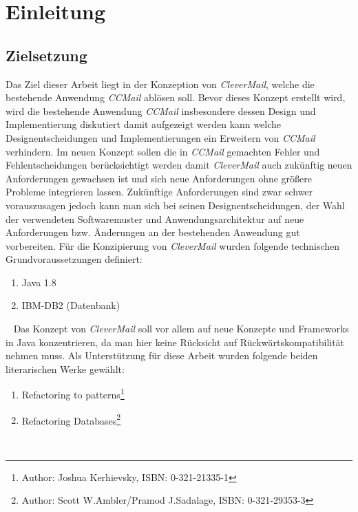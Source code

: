 \chapter{Einleitung}
\label{cha:einleitung}
\section{Zielsetzung}
\label{sec:zielsetzung}
Das Ziel dieser Arbeit liegt in der Konzeption von \emph{CleverMail}, welche die bestehende Anwendung \emph{CCMail} ablösen soll. Bevor dieses Konzept erstellt wird, wird die bestehende Anwendung \emph{CCMail} insbesondere dessen Design und Implementierung diskutiert damit aufgezeigt werden kann welche \newline
Designentscheidungen und Implementierungen ein Erweitern von \emph{CCMail} verhindern. Im neuen Konzept sollen die in \emph{CCMail} gemachten Fehler und Fehlentscheidungen berücksichtigt werden damit \emph{CleverMail} auch \newline
zukünftig neuen Anforderungen gewachsen ist und sich neue Anforderungen ohne größere Probleme integrieren lassen. Zukünftige Anforderungen sind zwar schwer vorauszusagen jedoch kann man sich bei seinen Designentscheidungen, der Wahl der verwendeten Softwaremuster und Anwendungsarchitektur auf neue Anforderungen bzw. Änderungen an der bestehenden Anwendung gut vorbereiten.
\newline\newline
Für die Konzipierung von \emph{CleverMail} wurden folgende technischen Grundvoraussetzungen definiert:
\begin{enumerate}
	\item Java 1.8
	\item IBM-DB2 (Datenbank)
\end{enumerate}
\ \newline
Das Konzept von \emph{CleverMail} soll vor allem auf neue Konzepte und Frameworks in Java konzentrieren, da man hier keine Rücksicht auf Rückwärtskompatibilität nehmen muss. 
\newpage
Als Unterstützung für diese Arbeit wurden folgende beiden literarischen Werke gewählt:
\begin{enumerate}
	\item Refactoring to patterns\footnote{Author: Joshua Kerhievsky, ISBN: 0-321-21335-1}
	\item Refactoring Databases\footnote{Author: Scott W.Ambler/Pramod J.Sadalage, ISBN: 0-321-29353-3} 
\end{enumerate}
\ \newline
